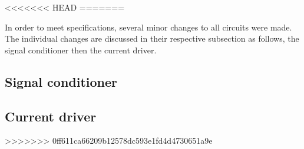 

<<<<<<< HEAD
=======

In order to meet specifications, several minor changes to all circuits were made. The individual changes are discussed in their respective subsection as follows, the signal conditioner then the current driver.


%


\subsection{Signal conditioner}
%

\subsection{Current driver}
%
>>>>>>> 0ff611ca66209b12578dc593e1fd4d4730651a9e
	
